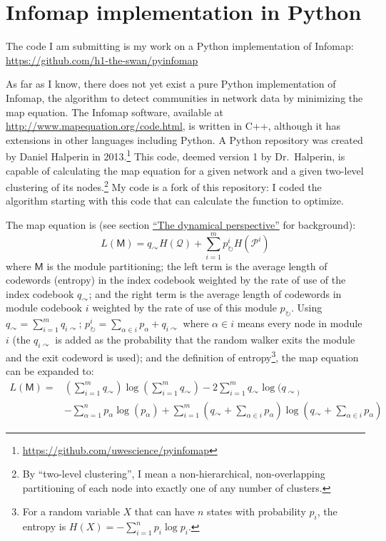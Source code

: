 \hypertarget{pyinfomap}{\section{Infomap implementation in
Python}\label{pyinfomap}}

\protect\hyperlink{pyinfomap}{}

The code I am submitting is my work on a Python implementation of
Infomap: \url{https://github.com/h1-the-swan/pyinfomap}

As far as I know, there does not yet exist a pure Python implementation
of Infomap, the algorithm to detect communities in network data by
minimizing the map equation. The Infomap software, available at
\url{http://www.mapequation.org/code.html}, is written in C++, although
it has extensions in other languages including Python. A Python
repository was created by Daniel Halperin in 2013.\footnote{\url{https://github.com/uwescience/pyinfomap}}
This code, deemed version 1 by Dr.~Halperin, is capable of calculating
the map equation for a given network and a given two-level clustering of
its nodes.\footnote{By ``two-level clustering'', I mean a
  non-hierarchical, non-overlapping partitioning of each node into
  exactly one of any number of clusters.} My code is a fork of this
repository: I coded the algorithm starting with this code that can
calculate the function to optimize.

The map equation is (see section
\protect\hyperlink{the-dynamical-perspective}{``The dynamical
perspective''} for background):
\[L(\mathsf{M}) = q_{\curvearrowright} H(\mathcal{Q}) + \sum_{i=1}^{m}{p_{\circlearrowright}^{i} H(\mathcal{P}^i)}\]
where \(\mathsf{M}\) is the module partitioning; the left term is the
average length of codewords (entropy) in the index codebook weighted by
the rate of use of the index codebook \(q_{\curvearrowright}\); and the
right term is the average length of codewords in module codebook \(i\)
weighted by the rate of use of this module \(p_{\circlearrowright}\).
Using \(q_{\curvearrowright} = \sum_{i=1}^{m}{q_{i\curvearrowright}}\);
\(p_{\circlearrowright}^{i} = \sum_{\alpha \in i}{p_{\alpha}} + q_{i\curvearrowright}\)
where \(\alpha \in i\) means every node in module \(i\) (the
\(q_{i\curvearrowright}\) is added as the probability that the random
walker exits the module and the exit codeword is used); and the
definition of entropy\footnote{For a random variable \(X\) that can have
  \(n\) states with probability \(p_i\), the entropy is
  \(H(X) = -\sum_{i=1}^{n}{p_i\log{p_i}}\).}, the map equation can be
expanded to: \[
\begin{aligned}
L(\mathsf{M}) = &\left(\sum_{i=1}^{m}{q_{\curvearrowright}}\right) 
                                        \log \left(\sum_{i=1}^{m}{q_{\curvearrowright}}\right)
                                        - 2 \sum_{i=1}^{m}{q_{\curvearrowright}} \log (q_{\curvearrowright)} \\
                                &- \sum_{\alpha=1}^{n}{p_{\alpha} \log(p_\alpha)}
                                        + \sum_{i=1}^{m}{\left(q_{\curvearrowright} + \sum_{\alpha \in i}{p_{\alpha}}\right) \log \left(q_{\curvearrowright} + \sum_{\alpha \in i}{p_{\alpha}}\right)}
\end{aligned}
\]

